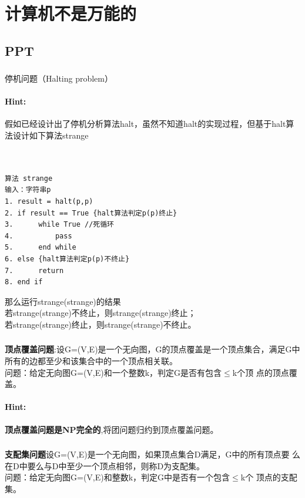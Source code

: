 \documentclass{article}
\begin{document}
     \section{计算机不是万能的}
     \subsection{PPT}
     
     \subsubsection{}停机问题（Halting problem）
     \paragraph{Hint:}
     假如已经设计出了停机分析算法halt，虽然不知道halt的实现过程，但基于halt算
法设计如下算法strange
\lstset{language=C}
    \begin{lstlisting} 


算法 strange
输入：字符串p
1. result = halt(p,p)
2. if result == True {halt算法判定p(p)终止}
3.      while True //死循环
4.          pass
5.      end while
6. else {halt算法判定p(p)不终止}
7.      return
8. end if
     \end{lstlisting} 
那么运行strange(strange)的结果\\
若strange(strange)不终止，则strange(strange)终止；\\
若strange(strange)终止，则strange(strange)不终止。\\
     
     \subsubsection{}\textbf{顶点覆盖问题}:设G=(V,E)是一个无向图，G的顶点覆盖是一个顶点集合，满足G中
所有的边都至少和该集合中的一个顶点相关联。\\
问题：给定无向图G=(V,E)和一个整数k，判定G是否有包含$\leq$k个顶
点的顶点覆盖。
     \paragraph{Hint:}\textbf{顶点覆盖问题是NP完全的},将团问题归约到顶点覆盖问题。
     
     \subsubsection{}\textbf{支配集问题}设G=(V,E)是一个无向图，如果顶点集合D满足，G中的所有顶点要
么在D中要么与D中至少一个顶点相邻，则称D为支配集。\\
问题：给定无向图G=(V,E)和整数k，判定G中是否有一个包含$\leq$k个
顶点的支配集。
\end{document}
